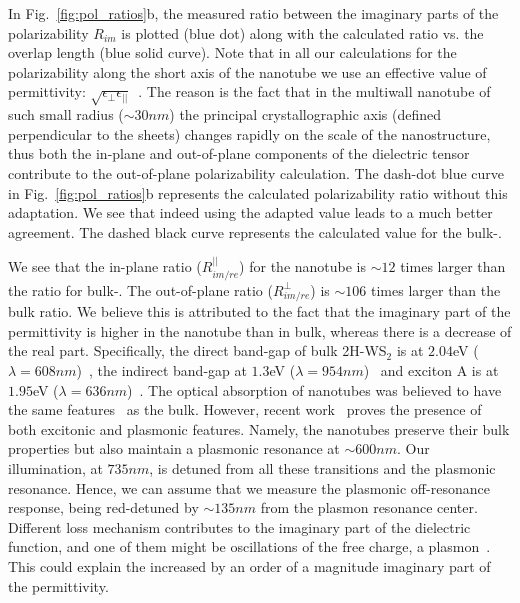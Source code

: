 \documentclass[journal=jacsat,manuscript=article]{achemso}
\begin{document}
In Fig.~\ref{fig:pol_ratios}b, the measured ratio between the imaginary parts of the polarizability $ R_{im}$ is plotted (blue dot) along with the calculated ratio vs. the overlap length (blue solid curve). Note that in all our calculations for the polarizability along the short axis of the nanotube we use an effective value of permittivity: $\sqrt{\epsilon_{\perp}\epsilon_{||}}$~\cite{taverna2002,kociak2001experimental}. The reason is the fact that in the multiwall nanotube of such small radius ($\sim 30nm$) the principal crystallographic axis (defined perpendicular to the  sheets) changes rapidly on the scale of the nanostructure, thus both the in-plane and out-of-plane components of the dielectric tensor contribute to the out-of-plane polarizability calculation. The dash-dot blue curve in Fig.~\ref{fig:pol_ratios}b represents the calculated polarizability ratio without this adaptation. We see that indeed using the adapted value leads to a much better agreement. The dashed black curve represents the calculated value for the bulk-.

We see that the in-plane ratio ($R_{im/re}^{||}$) for the  nanotube is $\sim12$ times larger than the ratio for bulk-. The out-of-plane ratio ($R_{im/re}^{\perp}$) is $\sim106$ times larger than the bulk ratio. We believe this is attributed to the fact that the imaginary part of the permittivity is higher in the nanotube than in bulk, whereas there is a decrease of the real part. Specifically, the direct band-gap of bulk 2H-WS$_2$ is at $2.04$eV ($\lambda=608nm$)~\cite{wilson1969transition}, the indirect band-gap at $1.3$eV ($\lambda=954nm$)~\cite{ballif1999optical} and exciton A is at $1.95$eV ($\lambda=636nm$)~\cite{frey1998optical}. The optical absorption of nanotubes was believed to have the same features~\cite{frey1998optical} as the bulk. However, recent work~\cite{Yadgarov2016unique} proves the presence of both excitonic and plasmonic features. Namely, the nanotubes preserve their  bulk properties but also maintain a plasmonic resonance at $\sim 600nm$. Our illumination, at $735nm$, is detuned from all these transitions and the plasmonic resonance. Hence, we can assume that we measure the plasmonic off-resonance response, being red-detuned by $\sim135nm$ from the plasmon resonance center.
Different loss mechanism contributes to the imaginary part of the dielectric function, and one of them might be oscillations of the free charge, a plasmon~\cite{Yadgarov2016unique}. This could explain the increased by an order of a magnitude imaginary part of the permittivity.
\end{document}
